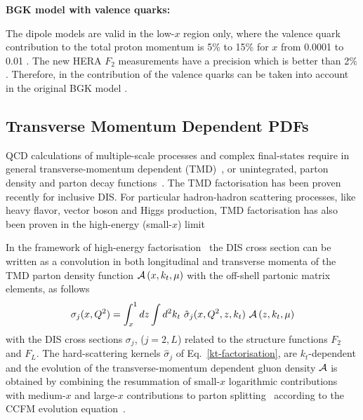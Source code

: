 \begin{description}
\vspace{0.1cm}
\item \bf {BGK model with valence quarks:} \rm

The dipole models are valid in the low-$x$ region only, where the valence quark contribution to the total proton momentum 
is 5\% to 15\% for $x$ from 0.0001 to 0.01 \cite{Collaboration:2010ry}.
The new HERA $F_2$ measurements have a precision which is better than 2$\%$. 
Therefore, in \fitter the contribution of the valence quarks can be taken into account in the original 
BGK model \cite{Belov,Luszczak:2013rxa}.
\end{description}

\subsection{Transverse Momentum Dependent PDFs}


\def\kt{\ensuremath{k_t}}
\def\pt{\ensuremath{p_t}}


QCD calculations of multiple-scale processes  and complex final-states
require in general transverse-momentum dependent (TMD)~\cite{Collins:2011zzd}, or 
unintegrated, parton  density and parton decay 
functions~\cite{Aybat:2011zv,Buffing:2013eka,Buffing:2013kca,Buffing:2012sz,Mulders:2008tf,Jadach:2009gm,Hautmann:2009zzb,Hautmann:2012pf,Hautmann:2007gw}.   
The TMD factorisation has been proven recently \cite{Collins:2011zzd} for inclusive DIS. For 
particular hadron-hadron scattering processes, like heavy flavor, vector boson and Higgs production, 
TMD factorisation has also been proven in the high-energy (small-$x$) limit \cite{Catani:1990xk,Collins:1991ty,Hautmann:2010be}
  
In the framework of high-energy factorisation~\cite{Catani:1990xk,Catani:1990eg,Catani:1993ww} 
the DIS cross section can be written as a convolution in 
both longitudinal and transverse momenta of the TMD parton density function 
${\cal A}\left(x,\kt,\mu\right)$    
 with the off-shell partonic matrix elements, as follows 
\begin{equation}
 \sigma_j (x, Q^2) = \int_x^1  
d z \int d^2k_t \ 
\hat{\sigma}_j(x,Q^2,{z},k_t) \ 
 {\cal  A}\left( {z} ,\kt, \mu \right) 
\label{kt-factorisation}
\end{equation}
with the DIS cross sections 
$\sigma_j$, ($j= 2 , L$) related to the  structure functions $F_2$ and $F_L$.
The hard-scattering kernels ${\hat \sigma}_j$ of Eq.~\ref{kt-factorisation},    
are $k_t$-dependent and the evolution  of the 
transverse-momentum dependent gluon density 
${\cal A} $ is obtained by combining the resummation of small-$x$ logarithmic 
contributions~\cite{Lipatov:1996ts,Fadin:1975cb,Balitsky:1978ic} with medium-$x$ and large-$x$ 
contributions to parton  splitting~\cite{Gribov:1972ri,Altarelli:1977zs,Dokshitzer:1977sg} according to the 
CCFM evolution equation~\cite{Ciafaloni:1987ur,Catani:1989sg,Marchesini:1994wr}.
  
